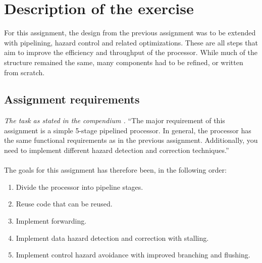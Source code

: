 \section{Description of the exercise}

For this assignment, the design from the previous assignment was to be extended
with pipelining, hazard control and related optimizations. These are all steps
that aim to improve the efficiency and throughput of the processor. While much
of the structure remained the same, many components had to be refined, or
written from scratch.

\subsection{Assignment requirements}
\emph{The task as stated in the compendium \cite{compendium}.}\newline
``The major requirement of this assignment is a simple 5-stage pipelined
processor. In general, the processor has the same functional requirements as in
the previous assignment. Additionally, you need to implement different hazard
detection and correction techniques.''
\paragraph*{}
The goals for this assignment has therefore been, in the following order:
\begin{enumerate}
	\item Divide the processor into pipeline stages.
	\item Reuse code that can be reused.
	\item Implement forwarding.
	\item Implement data hazard detection and correction with stalling.
	\item Implement control hazard avoidance with improved branching and
flushing.
\end{enumerate}
